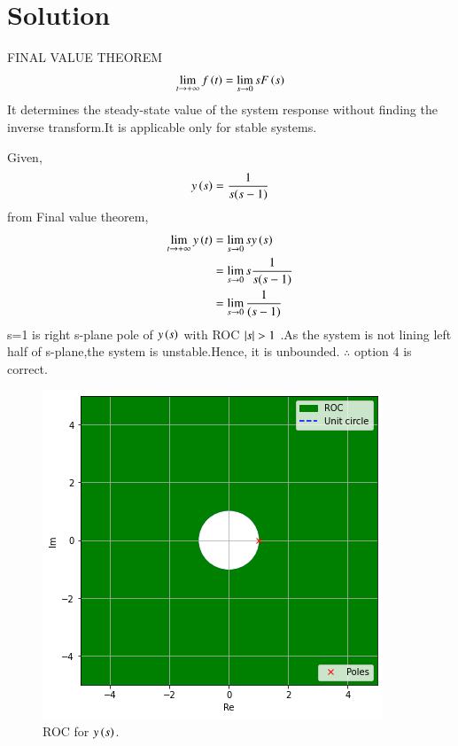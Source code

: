 \documentclass[journal,12pt,twocolumn]{IEEEtran}
\begin{document}
\section{Solution}
\begin{theorem}
FINAL VALUE THEOREM
\begin{align}
   	\lim_{t \to +\infty} f\left(t\right) = \lim_{s \to 0} sF\left(s\right)
\end{align}
It determines the steady-state value of the system response without finding the inverse transform.It is applicable only for stable systems.
\end{theorem}
Given,
$$y\left(s\right)=\dfrac{1}{s(s-1)}$$
from Final value theorem,
\begin{align}
   	\lim_{t \to +\infty} y\left(t\right) &= \lim_{s \to 0} sy\left(s\right)\\
   	&= \lim_{s \to 0} s\dfrac{1}{s(s-1)}\\
   	&= \lim_{s \to 0} \dfrac{1}{(s-1)}
\end{align}
s=1 is right s-plane pole of $y\left(s\right)$ with ROC $\vert s\vert>1$ .As the system is not lining left half of s-plane,the system is unstable.Hence, it is unbounded.
$\therefore$ option 4 is correct.
\begin{figure}[!h]
 \centering
 \includegraphics[width=\columnwidth]{fig_GA_1.png}
 \caption{ROC for $y\left(s\right)$.}
\end{figure}
\end{document}
